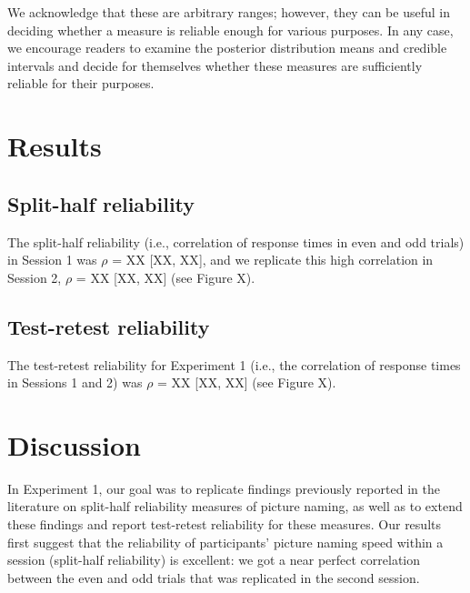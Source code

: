 \documentclass[
  man,floatsintext]{apa6}
\begin{document}
We acknowledge that these are arbitrary ranges; however, they can be useful in deciding whether a measure is reliable enough for various purposes. In any case, we encourage readers to examine the posterior distribution means and credible intervals and decide for themselves whether these measures are sufficiently reliable for their purposes.

\hypertarget{results}{%
\section{Results}\label{results}}

\hypertarget{split-half-reliability}{%
\subsection{Split-half reliability}\label{split-half-reliability}}

The split-half reliability (i.e., correlation of response times in even and odd trials) in Session 1 was \(\rho{}\) = XX {[}XX, XX{]}, and we replicate this high correlation in Session 2, \(\rho{}\) = XX {[}XX, XX{]} (see Figure X).

\hypertarget{test-retest-reliability}{%
\subsection{Test-retest reliability}\label{test-retest-reliability}}

The test-retest reliability for Experiment 1 (i.e., the correlation of response times in Sessions 1 and 2) was \(\rho{}\) = XX {[}XX, XX{]} (see Figure X).

\hypertarget{discussion}{%
\section{Discussion}\label{discussion}}

In Experiment 1, our goal was to replicate findings previously reported in the literature on split-half reliability measures of picture naming, as well as to extend these findings and report test-retest reliability for these measures. Our results first suggest that the reliability of participants' picture naming speed within a session (split-half reliability) is excellent: we got a near perfect correlation between the even and odd trials that was replicated in the second session.
\end{document}
